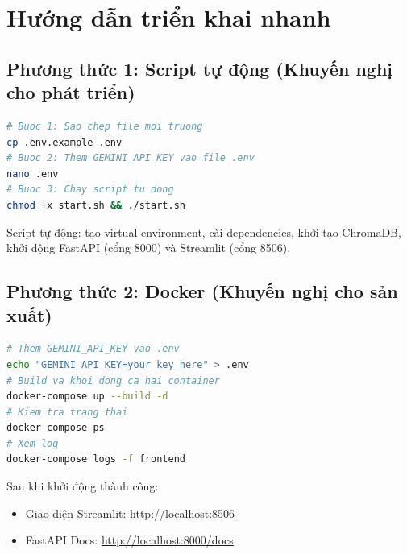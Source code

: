 \documentclass[13pt,a4paper]{extreport}
\begin{document}
\chapter{Hướng dẫn triển khai nhanh}

\section*{Phương thức 1: Script tự động (Khuyến nghị cho phát triển)}
\begin{lstlisting}[language=bash, numbers=none, caption={Khởi động 1-click với start.sh}]
# Buoc 1: Sao chep file moi truong
cp .env.example .env
# Buoc 2: Them GEMINI_API_KEY vao file .env
nano .env
# Buoc 3: Chay script tu dong
chmod +x start.sh && ./start.sh
\end{lstlisting}

\noindent Script tự động: tạo virtual environment, cài dependencies, khởi tạo ChromaDB, khởi động FastAPI (cổng 8000) và Streamlit (cổng 8506).

\section*{Phương thức 2: Docker (Khuyến nghị cho sản xuất)}
\begin{lstlisting}[language=bash, numbers=none, caption={Triển khai với Docker Compose}]
# Them GEMINI_API_KEY vao .env
echo "GEMINI_API_KEY=your_key_here" > .env
# Build va khoi dong ca hai container
docker-compose up --build -d
# Kiem tra trang thai
docker-compose ps
# Xem log
docker-compose logs -f frontend
\end{lstlisting}

\noindent Sau khi khởi động thành công:
\begin{itemize}
    \item Giao diện Streamlit: \url{http://localhost:8506}
    \item FastAPI Docs: \url{http://localhost:8000/docs}
\end{itemize}
\end{document}
